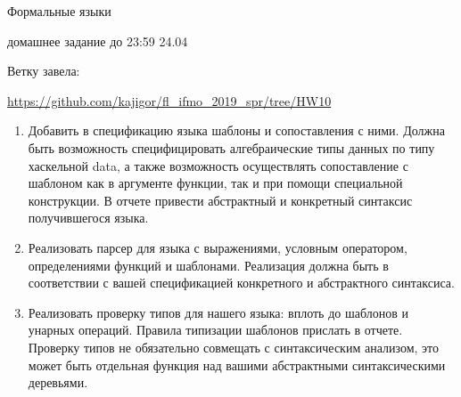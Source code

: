 \documentclass[12pt]{article}
\begin{document}
\begin{center}
\LARGE {Формальные языки}

\Large {домашнее задание до 23:59 24.04}
\end{center} 

\bigskip

Ветку завела: 

\url{https://github.com/kajigor/fl\_ifmo\_2019\_spr/tree/HW10}

\begin{enumerate}
  \item Добавить в спецификацию языка шаблоны и сопоставления с ними. Должна быть возможность специфицировать алгебраические типы данных по типу хаскельной data, а также возможность осуществлять сопоставление с шаблоном как в аргументе функции, так и при помощи специальной конструкции. В отчете привести абстрактный и конкретный синтаксис получившегося языка. 
  \item Реализовать парсер для языка с выражениями, условным оператором, определениями функций и шаблонами. Реализация должна быть в соответствии с вашей спецификацией конкретного и абстрактного синтаксиса. 
  \item Реализовать проверку типов для нашего языка: вплоть до шаблонов и унарных операций. Правила типизации шаблонов прислать в отчете. Проверку типов не обязательно совмещать с синтаксическим анализом, это может быть отдельная функция над вашими абстрактными синтаксическими деревьями. 
\end{enumerate}


\bigskip


\bigskip


\bigskip


\bigskip


\bigskip


\bigskip 

\end{document}
